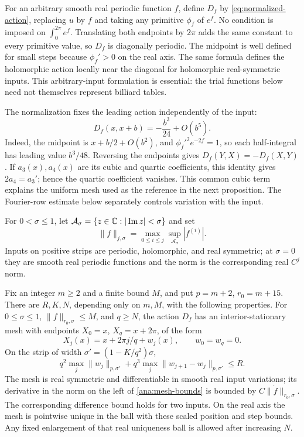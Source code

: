 For an arbitrary smooth real periodic function \(f\), define \(D_f\)
by \eqref{eq:normalized-action}, replacing \(u\) by \(f\) and taking
any primitive \(\phi_f\) of \(e^f\).  No condition is imposed on
\(\int_0^{2\pi}e^f\).  Translating both endpoints by \(2\pi\)
adds the same constant to every primitive value, so \(D_f\) is
diagonally periodic.  The midpoint is well defined for small steps
because \(\phi_f'>0\) on the real axis.  The same formula defines
the holomorphic action locally near the diagonal for holomorphic
real-symmetric inputs.  This arbitrary-input formulation is essential:
the trial functions below need not themselves represent billiard tables.

The normalization fixes the leading action independently of the input:
\begin{equation}\label{ana:universal-cubic}
 D_f(x,x+b)=-\frac{b^3}{24}+O(b^5).
\end{equation}
Indeed, the midpoint is \(x+b/2+O(b^2)\), and
\(\phi_f'^2e^{-2f}=1\), so each half-integral has leading value
\(b^3/48\). Reversing the endpoints gives
\(D_f(Y,X)=-D_f(X,Y)\). If \(a_3(x),a_4(x)\) are its cubic and
quartic coefficients, this identity gives \(2a_4=a_3'\); hence the
quartic coefficient vanishes. This common cubic term explains the
uniform mesh used as the reference in the next proposition. The
Fourier-row estimate below separately controls variation with the input.

For \(0<\sigma\le1\), let
\(\mathcal A_\sigma=\{z\in\mathbb{C}:|\operatorname{Im}z|<\sigma\}\) and set
\[
 \|f\|_{j,\sigma}=
 \max_{0\le i\le j}\sup_{\mathcal A_\sigma}|f^{(i)}|.
\]
Inputs on positive strips are periodic, holomorphic, and real symmetric;
at \(\sigma=0\) they are smooth real periodic functions and the norm
is the corresponding real \(C^j\) norm.

\begin{proposition}
\label{prop:mesh-input}
Fix an integer \(m\ge2\) and a finite bound \(M\), and put
\(p=m+2\), \(r_0=m+15\).  There are \(R,K,N\), depending only on
\(m,M\), with the following properties.  For
\(0\le\sigma\le1\), \(\|f\|_{r_0,\sigma}\le M\), and \(q\ge N\),
the action \(D_f\) has an interior-stationary mesh with endpoints
\(X_0=x\), \(X_q=x+2\pi\), of the form
\[
 X_j(x)=x+2\pi j/q+w_j(x),\qquad w_0=w_q=0.
\]
On the strip of width \(\sigma'=(1-K/q^2)\sigma\),
\begin{equation}\label{ana:mesh-bounds}
 q^2\max_j\|w_j\|_{p,\sigma'}+
 q^3\max_j\|w_{j+1}-w_j\|_{p,\sigma'}\le R.
\end{equation}
The mesh is real symmetric and differentiable in smooth real input
variations; its derivative in the norm on the left of
\eqref{ana:mesh-bounds} is bounded by
\(C\|\dot f\|_{r_0,\sigma}\).  The corresponding difference bound
holds for two inputs.  On the real axis the mesh is pointwise unique
in the ball with these scaled position and step bounds.  Any fixed
enlargement of that real uniqueness ball is allowed after increasing
\(N\).
\end{proposition}

